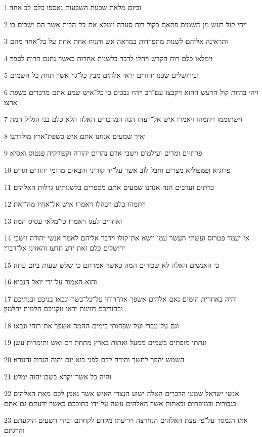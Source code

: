 \par 1 וביום מלאת שבעת השבעות נאספו כלם לב אחד׃
\par 2 ויהי קול רעש מן־השמים פתאם כקול רוח סערה וימלא את־כל־הבית אשר הם ישבים בו׃
\par 3 ותראינה אליהם לשנות מתפרדות במראה אש ותנוח אחת אחת על כל־אחד מהם׃
\par 4 וימלאו כלם רוח הקדש ויחלו לדבר בלשנות אחרות כאשר נתנם הרוח לספר׃
\par 5 ובירושלים שכנו יהודים יראי אלהים מבין כל־גוי אשר תחת כל השמים׃
\par 6 ויהי בהיות קול הרעש ההוא ויקבצו עם־רב ויהיו נבכים כי כל־איש שמע אתם מדברים כשפת ארצו׃
\par 7 וישתוממו ויתמהו ויאמרו איש אל־רעהו הנה המדברים האלה הלא כלם בני הגליל המה׃
\par 8 ואיך שמעים אנחנו אתם איש כשפת־ארץ מולדתנו׃
\par 9 פרתיים ומדים ועילמים וישבי ארם נהרים יהודה וקפודקיה פנטוס ואסיא׃
\par 10 פרוגיא ופמפוליא מצרים וחבל לוב אשר על־יד קוריני והבאים מרומי יהודים וגרים׃
\par 11 כרתים וערבים הנה אנחנו שמעים אתם מספרים בלשנותינו גדלות האלהים׃
\par 12 ויתמהו כלם ויבהלו ויאמרו איש אל־אחיו מה־זאת׃
\par 13 ואחרים לעגו ויאמרו כי־מלאי עסיס המה׃
\par 14 אז יעמד פטרוס ועשתי העשר עמו וישא את־קולו וידבר אליהם לאמר אנשי יהודה וישבי ירושלים כלם זאת ידע תדעו והאזינו אל־דברי׃
\par 15 כי האנשים האלה לא שכורים המה כאשר אמרתם כי שלש שעות ביום עתה׃
\par 16 והוא האמור על־ידי יואל הנביא׃
\par 17 והיה באחרית הימים נאם אלהים אשפך את־רוחי על־כל־בשר ונבאו בניכם ובנתיכם ובחוריכם חזינות יראו וזקניכם חלמות יחלמון׃
\par 18 וגם על־עבדי ועל־שפחותי בימים ההמה אשפך את־רוחי ונבאו׃
\par 19 ונתתי מופתים בשמים ממעל ואתות בארץ מתחת דם ואש ותימרות עשן׃
\par 20 השמש יהפך לחשך והירח לדם לפני בוא יום יהוה הגדול והנורא׃
\par 21 והיה כל אשר־יקרא בשם־יהוה ימלט׃
\par 22 אנשי ישראל שמעו הדברים האלה ישוע הנצרי האיש אשר נאמן לכם מאת האלהים בגבורות ובמופתים ובאתות אשר האלהים עשה על־ידו בתוככם כאשר ידעתם גם־אתם׃
\par 23 אתו הנמסר על־פי עצת האלהים הנחרצה וידיעתו מקדם לקחתם ובידי רשעים הוקעתם והרגתם׃
